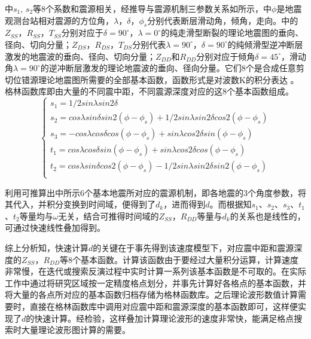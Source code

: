 中$s_1$, $s_2$等8个系数和震源相关，经推导\citep{mashutian1999}与震源机制三参数关系如所示，中$\phi$是地震观测台站相对震源的方位角，$\lambda$，$\delta$，${\phi}_s$分别代表断层滑动角，倾角，走向。中的$Z_{SS}$，$R_{SS}$，$T_{SS}$分别对应于$\delta=90^\circ$，$\lambda=0^\circ$的纯走滑型断裂的理论地震图的垂向、径向、切向分量；$Z_{DS}$，$R_{DS}$，$T_{DS}$分别代表$\lambda=90^\circ$，$\delta=90^\circ$的纯倾滑型逆冲断层激发的地震波的垂向、径向、切向分量；$Z_{DD}$和$R_{DD}$分别对应于倾角$\delta=45^\circ$，滑动角$\lambda=90^\circ$的逆冲断层激发的理论地震波的垂向、径向分量。它们8个是合成任意剪切位错源理论地震图所需要的全部基本函数，函数形式是对波数K的积分表达\citep{Wang1980} 。格林函数库即由大量的不同震中距，不同震源深度对应的这8个基本函数组成。
\begin{equation}
\label{eq2_11}
\left\{
    \begin{array}{l}
    s_1=1/2{sin\lambda}sin{2\delta}\\
    s_2={cos\lambda}{sin\delta}sin2({\phi}-{\phi}_s)+1/2{sin\lambda}{sin2\delta}cos2({\phi}-{\phi}_s)\\
    s_3=-{cos\lambda}{cos\delta}cos({\phi}-{\phi}_s)+{sin\lambda}{cos2\delta}sin({\phi}-{\phi}_s)\\
    t_1={cos\lambda}{cos\delta}sin({\phi}-{\phi}_s)+{sin\lambda}{cos2\delta}cos({\phi}-{\phi}_s)\\
    t_2={cos\lambda}{sin\delta}cos2({\phi}-{\phi}_s)-1/2{sin\lambda}{sin2\delta}sin2({\phi}-{\phi}_s)\\
    \end{array}
\right.
\end{equation}

利用可推算出中所示6个基本地震所对应的震源机制，即各地震的3个角度参数，将其代入，并积分变换到时间域，便得到了$d_k$，进而得到$d$。而根据知$s_1$、$s_2$、$s_3$、$t_1$、$t_2$等量均与$\omega$无关，结合可推得时间域的$Z_{SS}$，$R_{DD}$等量与$d_k$的关系也是线性的，可通过快速线性叠加得到。

综上分析知，快速计算$d$的关键在于事先得到该速度模型下，对应震中距和震源深度的$Z_{SS}$，$R_{DD}$等8个基本函数。计算该函数由于要经过大量积分运算，计算速度非常慢，在迭代或搜索反演过程中实时计算一系列该基本函数是不可取的。在实际工作中通过将研究区域按一定精度格点划分，并事先计算好各格点的基本函数，并将大量的各点所对应的基本函数归档存储为格林函数库。之后理论波形数值计算需要时，直接在格林函数库中调用对应震中距和震源深度的基本函数即可，这样便实现了$d$的快速计算。经检验，这样叠加计算理论波形的速度非常快，能满足格点搜索时大量理论波形图计算的需要。

